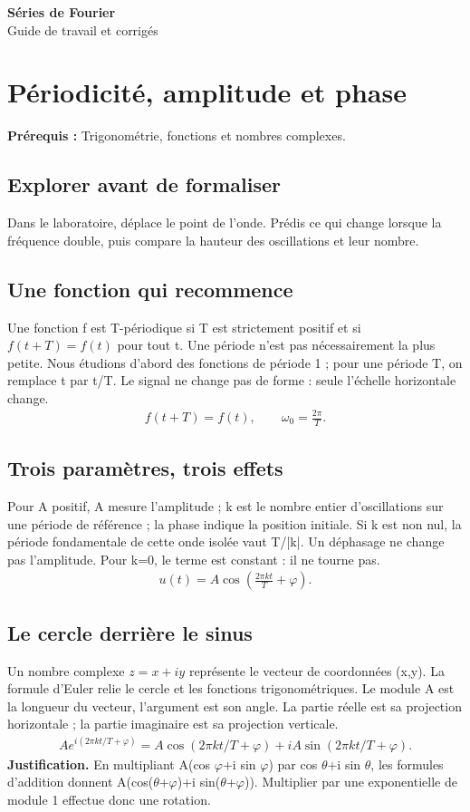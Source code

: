 \documentclass[11pt,a4paper]{article}
\newcommand{\editiontitle}[1]{\begin{center}{\Large\bfseries Séries de Fourier}\\[8pt]#1\end{center}}
\begin{document}
\editiontitle{Guide de travail et corrigés}\tableofcontents\clearpage
\section{Périodicité, amplitude et phase}
\textbf{Prérequis :} Trigonométrie, fonctions et nombres complexes.
\subsection*{Explorer avant de formaliser}Dans le laboratoire, déplace le point de l’onde. Prédis ce qui change lorsque la fréquence double, puis compare la hauteur des oscillations et leur nombre.
\subsection{Une fonction qui recommence}
Une fonction f est T-périodique si T est strictement positif et si $f(t+T)=f(t)$ pour tout t. Une période n’est pas nécessairement la plus petite. Nous étudions d’abord des fonctions de période 1 ; pour une période T, on remplace t par t/T. Le signal ne change pas de forme : seule l’échelle horizontale change.
\[\begin{gathered}f(t+T)=f(t),\qquad \omega_0=\frac{2\pi}{T}.\end{gathered}\]
\subsection{Trois paramètres, trois effets}
Pour A positif, A mesure l’amplitude ; k est le nombre entier d’oscillations sur une période de référence ; la phase indique la position initiale. Si k est non nul, la période fondamentale de cette onde isolée vaut T/|k|. Un déphasage ne change pas l’amplitude. Pour k=0, le terme est constant : il ne tourne pas.
\[\begin{gathered}u(t)=A\cos\left(\frac{2\pi k t}{T}+\varphi\right).\end{gathered}\]
\subsection{Le cercle derrière le sinus}
Un nombre complexe $z=x+iy$ représente le vecteur de coordonnées (x,y). La formule d’Euler relie le cercle et les fonctions trigonométriques. Le module A est la longueur du vecteur, l’argument est son angle. La partie réelle est sa projection horizontale ; la partie imaginaire est sa projection verticale.
\[\begin{gathered}Ae^{i(2\pi kt/T+\varphi)}=A\cos(2\pi kt/T+\varphi)+iA\sin(2\pi kt/T+\varphi).\end{gathered}\]
\textbf{Justification.} En multipliant A(cos $\varphi$+i sin $\varphi$) par cos $\theta$+i sin $\theta$, les formules d’addition donnent A(cos($\theta$+$\varphi$)+i sin($\theta$+$\varphi$)). Multiplier par une exponentielle de module 1 effectue donc une rotation.
\end{document}

